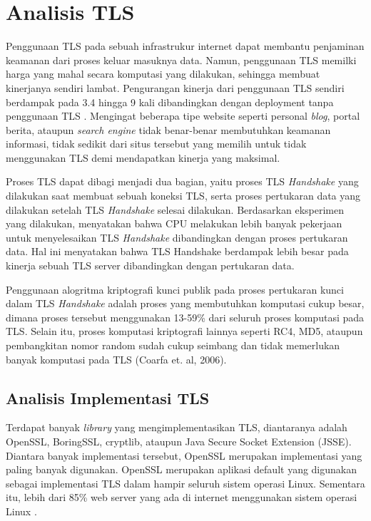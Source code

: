 
\section{Analisis TLS}
Penggunaan TLS pada sebuah infrastrukur internet dapat membantu penjaminan keamanan dari proses keluar masuknya data. Namun, penggunaan TLS memilki harga yang mahal secara komputasi yang dilakukan, sehingga membuat kinerjanya sendiri lambat. Pengurangan kinerja dari penggunaan TLS sendiri berdampak pada 3.4 hingga 9 kali dibandingkan dengan deployment tanpa penggunaan TLS \citep{perf_tls}. Mengingat beberapa tipe website seperti personal \textit{blog}, portal berita, ataupun \textit{search engine} tidak benar-benar membutuhkan keamanan informasi, tidak sedikit dari situs tersebut yang memilih untuk tidak menggunakan TLS demi mendapatkan kinerja yang maksimal.


Proses TLS dapat dibagi menjadi dua bagian, yaitu proses TLS \textit{Handshake} yang dilakukan saat membuat sebuah koneksi TLS, serta proses pertukaran data yang dilakukan setelah TLS \textit{Handshake} selesai dilakukan. Berdasarkan eksperimen yang dilakukan, \cite{perf_tls} menyatakan bahwa CPU melakukan lebih banyak pekerjaan untuk menyelesaikan TLS \textit{Handshake} dibandingkan dengan proses pertukaran data. Hal ini menyatakan bahwa TLS Handshake berdampak lebih besar pada kinerja sebuah TLS server dibandingkan dengan pertukaran data.

Penggunaan alogritma kriptografi kunci publik pada proses pertukaran kunci  dalam TLS \textit{Handshake} adalah proses yang membutuhkan komputasi cukup besar, dimana proses tersebut menggunakan 13-59\% dari seluruh proses komputasi pada TLS. Selain itu, proses komputasi kriptografi lainnya seperti RC4, MD5, ataupun pembangkitan nomor random sudah cukup seimbang dan tidak memerlukan banyak komputasi pada TLS (Coarfa et. al, 2006).

\subsection{Analisis Implementasi TLS}
Terdapat banyak \textit{library} yang mengimplementasikan TLS, diantaranya adalah OpenSSL, BoringSSL, cryptlib, ataupun Java Secure Socket Extension (JSSE). Diantara banyak implementasi tersebut, OpenSSL merupakan implementasi yang paling banyak digunakan. OpenSSL merupakan aplikasi default yang digunakan sebagai implementasi TLS dalam hampir seluruh sistem operasi Linux. Sementara itu, lebih dari 85\% web server yang ada di internet menggunakan sistem operasi Linux \citep{server_os_marketshare}.

